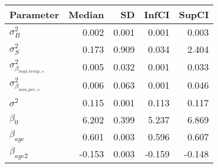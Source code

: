 \begin{table}[ht]
\centering
\begin{tabular}{lrrrr}
  \hline
Parameter & Median & SD & InfCI & SupCI \\ 
  \hline
$\sigma^{2}_{B}$ & 0.002 & 0.001 & 0.001 & 0.003 \\ 
  $\sigma^{2}_{S}$ & 0.173 & 0.909 & 0.034 & 2.404 \\ 
  $\sigma^{2}_{\beta_{max.temp,s}}$ & 0.005 & 0.032 & 0.001 & 0.033 \\ 
  $\sigma^{2}_{\beta_{min.pre,s}}$ & 0.006 & 0.063 & 0.001 & 0.046 \\ 
  $\sigma^{2}$ & 0.115 & 0.001 & 0.113 & 0.117 \\ 
  $\beta_{0}$ & 6.202 & 0.399 & 5.237 & 6.869 \\ 
  $\beta_{age}$ & 0.601 & 0.003 & 0.596 & 0.607 \\ 
  $\beta_{age2}$ & -0.153 & 0.003 & -0.159 & -0.148 \\ 
   \hline
\end{tabular}
\end{table}
